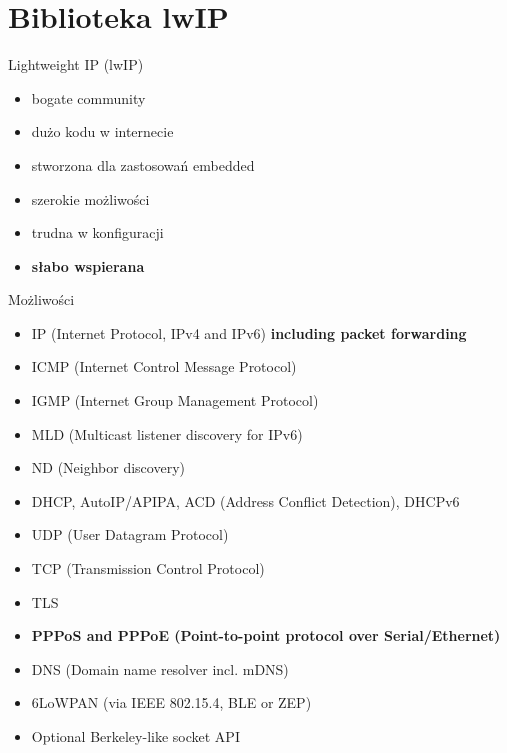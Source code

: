\section{Biblioteka lwIP}
    \begin{frame}{Lightweight IP (lwIP)}
        \begin{itemize}
            \item bogate community
            \item dużo kodu w internecie
            \item stworzona dla zastosowań embedded
            \item szerokie możliwości
            \item trudna w konfiguracji
            \item \textbf{słabo wspierana}
        \end{itemize}
    \end{frame}

    \begin{frame}{Możliwości}
        \begin{itemize}
            \item IP (Internet Protocol, IPv4 and IPv6) \textbf{including packet forwarding}
            \item ICMP (Internet Control Message Protocol)
            \item IGMP (Internet Group Management Protocol)
            \item MLD (Multicast listener discovery for IPv6)
            \item ND (Neighbor discovery)
            \item DHCP, AutoIP/APIPA, ACD (Address Conflict Detection), DHCPv6
            \item UDP (User Datagram Protocol)
            \item TCP (Transmission Control Protocol)
            \item TLS
            \item \textbf{PPPoS and PPPoE (Point-to-point protocol over Serial/Ethernet)}
            \item DNS (Domain name resolver incl. mDNS)
            \item 6LoWPAN (via IEEE 802.15.4, BLE or ZEP)
            \item Optional Berkeley-like socket API
        \end{itemize}
    \end{frame}

